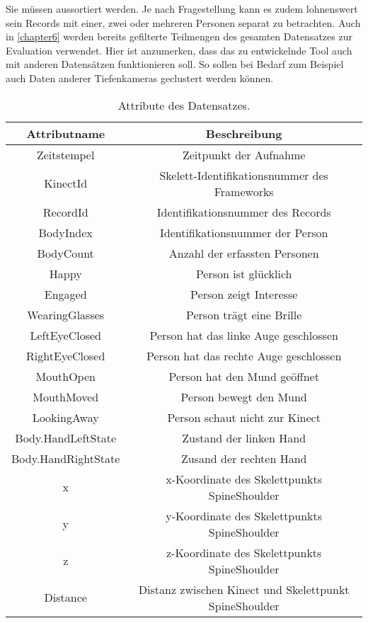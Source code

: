 Sie müssen aussortiert werden.
Je nach Fragestellung kann es zudem lohnenswert sein Records mit einer, zwei oder mehreren Personen
separat zu betrachten.
Auch in \autoref{chapter6} werden bereits gefilterte Teilmengen des gesamten Datensatzes zur Evaluation verwendet.
Hier ist anzumerken, dass das zu entwickelnde Tool auch mit anderen Datensätzen funktionieren soll.
So sollen bei Bedarf zum Beispiel auch Daten anderer Tiefenkameras geclustert werden können.
\begin{table}[ht]
  \begin{center}
    \begin{tabular}{ |c|c| } 
      \hline
      Attributname & Beschreibung \\
      \hline \hline
      Zeitstempel & Zeitpunkt der Aufnahme \\
      \hline
      KinectId & Skelett-Identifikationsnummer des Frameworks  \\
      \hline
      RecordId & Identifikationsnummer des Records \\
      \hline
      BodyIndex & Identifikationsnummer der Person \\
      \hline
      BodyCount & Anzahl der erfassten Personen \\
      \hline
      Happy & Person ist glücklich \\
      \hline
      Engaged & Person zeigt Interesse \\
      \hline
      WearingGlasses & Person trägt eine Brille \\
      \hline
      LeftEyeClosed & Person hat das linke Auge geschlossen \\
      \hline
      RightEyeClosed & Person hat das rechte Auge geschlossen \\
      \hline
      MouthOpen & Person hat den Mund geöffnet \\
      \hline
      MouthMoved & Person bewegt den Mund\\
      \hline
      LookingAway & Person schaut nicht zur Kinect \\
      \hline
      Body.HandLeftState & Zustand der linken Hand \\
      \hline
      Body.HandRightState & Zusand der rechten Hand \\
      \hline
      x & x-Koordinate des Skelettpunkts SpineShoulder \\
      \hline
      y & y-Koordinate des Skelettpunkts SpineShoulder \\
      \hline
      z & z-Koordinate des Skelettpunkts SpineShoulder \\
      \hline
      Distance & Distanz zwischen Kinect und Skelettpunkt SpineShoulder \\
      \hline
    \end{tabular}
    \caption{Attribute des Datensatzes.}
    \label{tbl:AttributesDataset}
  \end{center}
\end{table}
